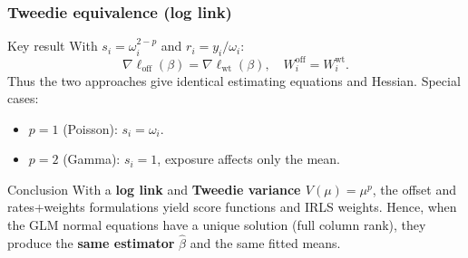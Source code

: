 \documentclass[10pt,aspectratio=169,xcolor={dvipsnames},usepdftitle=false]{beamer}
\begin{document}
\begin{frame}
\frametitle{Tweedie equivalence (log link)}

\begin{block}{Key result}
With $s_i=\omega_i^{2-p}$ and $r_i=y_i/\omega_i$:
\[
\nabla \ell_{\text{off}}(\beta) = \nabla \ell_{\text{wt}}(\beta), \quad
W_i^{\text{off}} = W_i^{\text{wt}}.
\]
Thus the two approaches give identical estimating equations and Hessian. Special cases:

\begin{itemize}
    \item $p=1$ (Poisson): $s_i = \omega_i$.
    \item $p=2$ (Gamma): $s_i = 1$, exposure affects only the mean.
\end{itemize}

\end{block}


\begin{exampleblock}{Conclusion}
With a \textbf{log link} and \textbf{Tweedie variance $V(\mu)=\mu^p$}, the offset and rates+weights formulations yield  score functions and IRLS weights. Hence, when the GLM normal equations have a unique solution (full column rank), they produce the \textbf{same estimator} $\hat\beta$ and the same fitted means.
\end{exampleblock}
\end{frame}
\end{document}

